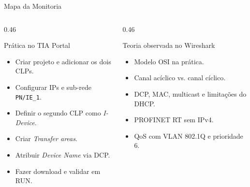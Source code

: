 \documentclass[10pt, aspectratio=169]{beamer}
\begin{document}
\begin{frame}{Mapa da Monitoria}
    \small
    \begin{columns}[T,totalwidth=\textwidth]
        \begin{column}{0.46\textwidth}
            \begin{block}{Pr\'atica no TIA Portal}
                \begin{itemize}
                    \item Criar projeto e adicionar os dois CLPs.
                    \item Configurar IPs e sub-rede \texttt{PN/IE\_1}.
                    \item Definir o segundo CLP como \textit{I-Device}.
                    \item Criar \textit{Transfer areas}.
                    \item Atribuir \textit{Device Name} via DCP.
                    \item Fazer download e validar em RUN.
                \end{itemize}
            \end{block}
        \end{column}
        \begin{column}{0.46\textwidth}
            \begin{block}{Teoria observada no Wireshark}
                \begin{itemize}
                    \item Modelo OSI na pr\'atica.
                    \item Canal ac\'iclico vs. canal c\'iclico.
                    \item DCP, MAC, multicast e limita\c{c}\~oes do DHCP.
                    \item PROFINET RT sem IPv4.
                    \item QoS com VLAN 802.1Q e prioridade 6.
                \end{itemize}
            \end{block}
        \end{column}
    \end{columns}
\end{frame}
\end{document}
